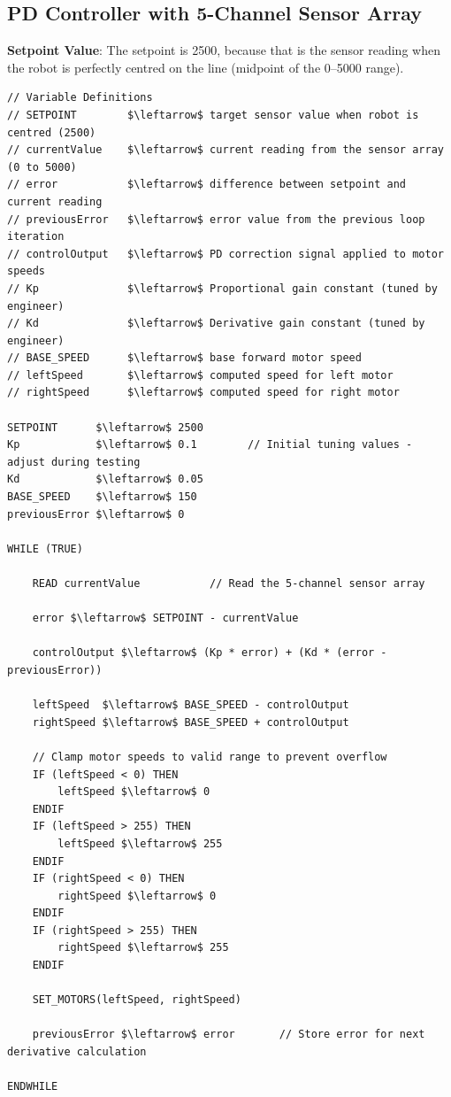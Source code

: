 \documentclass[11 pt , a 4 paper ]{article}
\theoremstyle{definition}
\begin{document}
  \subsection*{PD Controller with 5-Channel Sensor Array}
  \textbf{Setpoint Value}: The setpoint is 2500, because that is the sensor reading when the robot is perfectly centred on the line (midpoint of the 0–5000 range).
  \begin{lstlisting}[mathescape=true]
// Variable Definitions
// SETPOINT        $\leftarrow$ target sensor value when robot is centred (2500)
// currentValue    $\leftarrow$ current reading from the sensor array (0 to 5000)
// error           $\leftarrow$ difference between setpoint and current reading
// previousError   $\leftarrow$ error value from the previous loop iteration
// controlOutput   $\leftarrow$ PD correction signal applied to motor speeds
// Kp              $\leftarrow$ Proportional gain constant (tuned by engineer)
// Kd              $\leftarrow$ Derivative gain constant (tuned by engineer)
// BASE_SPEED      $\leftarrow$ base forward motor speed
// leftSpeed       $\leftarrow$ computed speed for left motor
// rightSpeed      $\leftarrow$ computed speed for right motor

SETPOINT      $\leftarrow$ 2500
Kp            $\leftarrow$ 0.1        // Initial tuning values - adjust during testing
Kd            $\leftarrow$ 0.05
BASE_SPEED    $\leftarrow$ 150
previousError $\leftarrow$ 0

WHILE (TRUE)

    READ currentValue           // Read the 5-channel sensor array

    error $\leftarrow$ SETPOINT - currentValue

    controlOutput $\leftarrow$ (Kp * error) + (Kd * (error - previousError))

    leftSpeed  $\leftarrow$ BASE_SPEED - controlOutput
    rightSpeed $\leftarrow$ BASE_SPEED + controlOutput

    // Clamp motor speeds to valid range to prevent overflow
    IF (leftSpeed < 0) THEN
        leftSpeed $\leftarrow$ 0
    ENDIF
    IF (leftSpeed > 255) THEN
        leftSpeed $\leftarrow$ 255
    ENDIF
    IF (rightSpeed < 0) THEN
        rightSpeed $\leftarrow$ 0
    ENDIF
    IF (rightSpeed > 255) THEN
        rightSpeed $\leftarrow$ 255
    ENDIF

    SET_MOTORS(leftSpeed, rightSpeed)

    previousError $\leftarrow$ error       // Store error for next derivative calculation

ENDWHILE
  \end{lstlisting}
\end{document}
